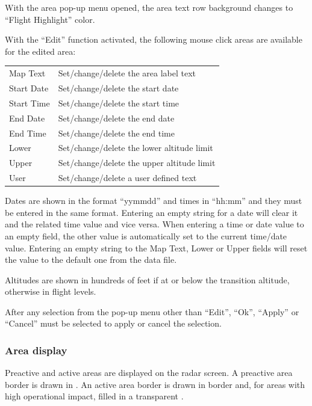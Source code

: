 \documentclass[a4paper,oneside,11pt]{memoir}
\begin{document}
With the area pop-up menu opened, the area text row background changes to “Flight Highlight” color. 

\bigskip

With the “Edit” function activated, the following mouse click areas are available for the edited area:

\begin{longtable}{p{2.5cm} p{10cm}}
  Map Text    & Set/change/delete the area label text\\
  Start Date  & Set/change/delete the start date\\
  Start Time  & Set/change/delete the start time\\
  End Date    & Set/change/delete the end date\\
  End Time    & Set/change/delete the end time\\
  Lower       & Set/change/delete the lower altitude limit\\
  Upper       & Set/change/delete the upper altitude limit\\
  User        & Set/change/delete a user defined text\\
\end{longtable}

Dates are shown in the format “yymmdd” and times in “hh:mm” and they must be entered in the same format. Entering an empty string for a date will clear it and the related time value and vice versa. When entering a time or date value to an empty field, the other value is automatically set to the current time/date value. Entering an empty string to the Map Text, Lower or Upper fields will reset the value to the default one from the data file.

\bigskip

Altitudes are shown in hundreds of feet if at or below the transition altitude, otherwise in flight levels.

\bigskip

After any selection from the pop-up menu other than “Edit”, “Ok”, “Apply” or “Cancel” must be selected to apply or cancel the selection. 

\subsubsection{Area display}

Preactive and active areas are displayed on the radar screen. A preactive area border is drawn in . An active area border is drawn in  border and, for areas with high operational impact, filled in a transparent . 
\end{document}
